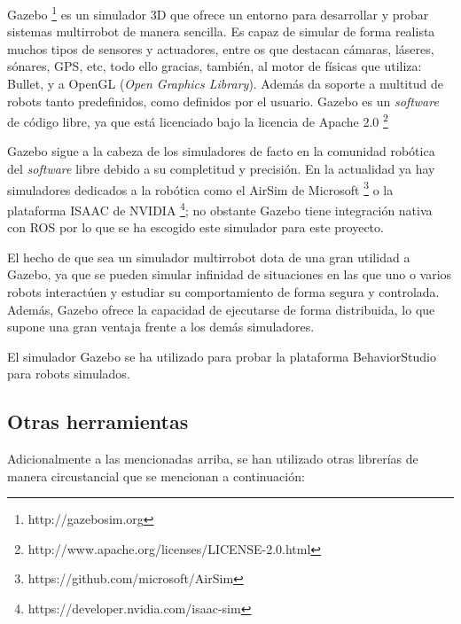 Gazebo \footnote{http://gazebosim.org} es un simulador 3D que ofrece un entorno para desarrollar y probar sistemas multirrobot de manera sencilla. Es capaz de simular de forma realista muchos tipos de sensores y actuadores, entre os que destacan cámaras, láseres, sónares, GPS, etc, todo ello gracias, también, al motor de físicas que utiliza: Bullet, y a OpenGL (\textit{Open Graphics Library}). Además da soporte a multitud de robots tanto predefinidos, como definidos por el usuario. Gazebo es un \textit{software} de código libre, ya que está licenciado bajo la licencia de Apache 2.0 \footnote{http://www.apache.org/licenses/LICENSE-2.0.html}

Gazebo sigue a la cabeza de los simuladores de facto en la comunidad robótica del \textit{software} libre debido a su completitud y precisión. En la actualidad ya hay simuladores dedicados a la robótica como el AirSim de Microsoft \footnote{https://github.com/microsoft/AirSim} o la plataforma ISAAC de NVIDIA \footnote{https://developer.nvidia.com/isaac-sim}; no obstante Gazebo tiene integración nativa con ROS por lo que se ha escogido este simulador para este proyecto.

El hecho de que sea un simulador multirrobot dota de una gran utilidad a Gazebo, ya que se pueden simular infinidad de situaciones en las que uno o varios robots interactúen y estudiar su comportamiento de forma segura y controlada. Además, Gazebo ofrece la capacidad de ejecutarse de forma distribuida, lo que supone una gran ventaja frente a los demás simuladores.

El simulador Gazebo se ha utilizado para probar la plataforma BehaviorStudio para robots simulados.


\subsection{Otras herramientas}

Adicionalmente a las mencionadas arriba, se han utilizado otras librerías de manera circustancial que se mencionan a continuación:

